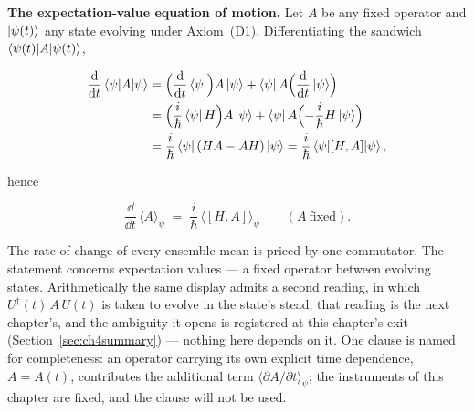 \textbf{The expectation-value equation of motion.} Let $A$ be any fixed operator and $\ket{\psi(t)}$ any state evolving under Axiom~(D1). Differentiating the sandwich $\braket{\psi(t)|A|\psi(t)}$,
\begin{linenomath}
    \begin{align}
        \frac{\mathrm{d}}{\mathrm{d} t}\braket{\psi|A|\psi}
        &= \Bigl(\frac{\mathrm{d}}{\mathrm{d} t}\bra{\psi}\Bigr)A\ket{\psi}
           + \bra{\psi}A\Bigl(\frac{\mathrm{d}}{\mathrm{d} t}\ket{\psi}\Bigr) \nonumber\\
        &= \Bigl(\frac{i}{\hbar}\bra{\psi}H\Bigr)A\ket{\psi}
           + \bra{\psi}A\Bigl(-\frac{i}{\hbar}H\ket{\psi}\Bigr) \nonumber\\
        &= \frac{i}{\hbar}\bra{\psi}(HA - AH)\ket{\psi}
         = \frac{i}{\hbar}\braket{\psi|[H,A]|\psi},
    \end{align}
\end{linenomath}
hence
\begin{linenomath}
    \begin{equation}
        \frac{\dd}{\dd t}\,\langle A\rangle_\psi \;=\; \frac{i}{\hbar}\,\bigl\langle [H,A] \bigr\rangle_\psi
        \qquad (A\ \text{fixed}) .
        \label{eq:expectation-eom}
    \end{equation}
\end{linenomath}
The rate of change of every ensemble mean is priced by one commutator. The statement concerns expectation values --- a fixed operator between evolving states. Arithmetically the same display admits a second reading, in which $U^\dagger(t)\,A\,U(t)$ is taken to evolve in the state's stead; that reading is the next chapter's, and the ambiguity it opens is registered at this chapter's exit (Section~\ref{sec:ch4summary}) --- nothing here depends on it. One clause is named for completeness: an operator carrying its own explicit time dependence, $A = A(t)$, contributes the additional term $\langle\partial A/\partial t\rangle_\psi$; the instruments of this chapter are fixed, and the clause will not be used.

